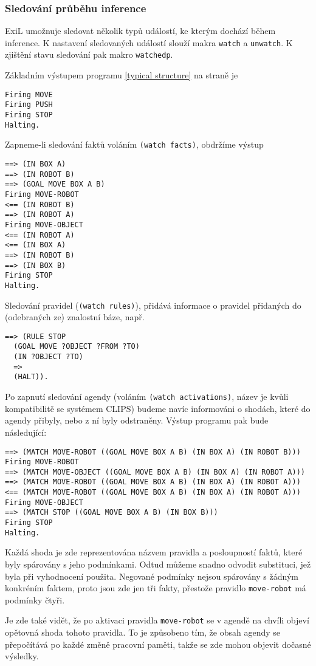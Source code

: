 \subsubsection{Sledování průběhu inference}
ExiL umožnuje sledovat několik typů událostí, ke kterým dochází během inference.
K nastavení sledovaných událostí slouží makra \verb|watch| a \verb|unwatch|. K
zjištění stavu sledování pak makro \verb|watchedp|.

Základním výstupem programu \ref{typical structure} na straně \pageref{typical
structure} je
\begin{verbatim}
Firing MOVE
Firing PUSH
Firing STOP
Halting.
\end{verbatim}
Zapneme-li sledování faktů voláním \verb|(watch facts)|, obdržíme výstup
\begin{verbatim}
==> (IN BOX A)
==> (IN ROBOT B)
==> (GOAL MOVE BOX A B)
Firing MOVE-ROBOT
<== (IN ROBOT B)
==> (IN ROBOT A)
Firing MOVE-OBJECT
<== (IN ROBOT A)
<== (IN BOX A)
==> (IN ROBOT B)
==> (IN BOX B)
Firing STOP
Halting.
\end{verbatim}

Sledování pravidel (\verb|(watch rules)|), přidává informace o pravidel
přidaných do (odebraných ze) znalostní báze, např.
\begin{verbatim}
==> (RULE STOP
  (GOAL MOVE ?OBJECT ?FROM ?TO)
  (IN ?OBJECT ?TO)
  =>
  (HALT)).
\end{verbatim}

Po zapnutí sledování agendy (voláním \verb|(watch activations)|, název je kvůli
kompatibilitě se systémem CLIPS) budeme navíc informováni o shodách, které do
agendy přibyly, nebo z ní byly odstraněny. Výstup programu pak bude následující:
\begin{verbatim}
==> (MATCH MOVE-ROBOT ((GOAL MOVE BOX A B) (IN BOX A) (IN ROBOT B)))
Firing MOVE-ROBOT
==> (MATCH MOVE-OBJECT ((GOAL MOVE BOX A B) (IN BOX A) (IN ROBOT A)))
==> (MATCH MOVE-ROBOT ((GOAL MOVE BOX A B) (IN BOX A) (IN ROBOT A)))
<== (MATCH MOVE-ROBOT ((GOAL MOVE BOX A B) (IN BOX A) (IN ROBOT A)))
Firing MOVE-OBJECT
==> (MATCH STOP ((GOAL MOVE BOX A B) (IN BOX B)))
Firing STOP
Halting.
\end{verbatim}
Každá shoda je zde reprezentována názvem pravidla a posloupností faktů, které
byly spárovány s jeho podmínkami. Odtud můžeme snadno odvodit substituci, jež
byla při vyhodnocení použita. Negované podmínky nejsou spárovány s žádným
konkréním faktem, proto jsou zde jen tři fakty, přestože pravidlo
\verb|move-robot| má podmínky čtyři.

Je zde také vidět, že po aktivaci pravidla
\verb|move-robot| se v agendě na chvíli objeví opětovná shoda tohoto pravidla.
To je způsobeno tím, že obsah agendy se přepočítává po každé změně pracovní
paměti, takže se zde mohou objevit dočasné výsledky.
